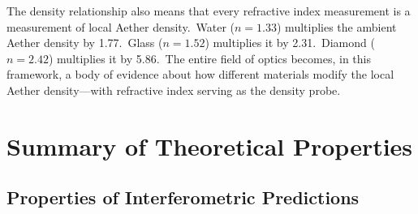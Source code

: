 ﻿\documentclass[12pt,letterpaper]{article}
\begin{document}
The density relationship also means that every refractive index measurement is a
measurement of local Aether density.\ Water ($n = 1.33$) multiplies the ambient Aether
density by 1.77.\ Glass ($n = 1.52$) multiplies it by 2.31.\ Diamond ($n = 2.42$) multiplies
it by 5.86.\ The entire field of optics becomes, in this framework, a body of evidence
about how different materials modify the local Aether density---with refractive index
serving as the density probe.



\section{Summary of Theoretical Properties}

\subsection{Properties of Interferometric Predictions}
\end{document}
